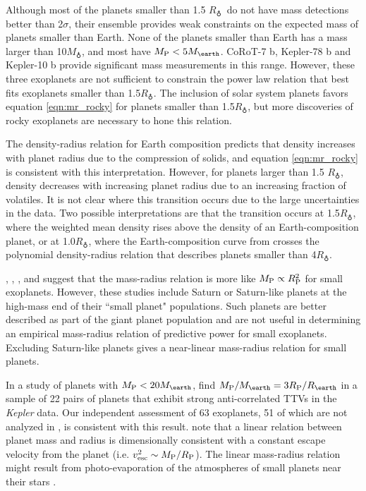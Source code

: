 \documentclass[iop]{emulateapj}
\newcommand{\rpl}{\ensuremath{R_{\rm P}}}
\newcommand{\mpl}{\ensuremath{M_{\rm P}}}
\newcommand{\rearth}{\ensuremath{R_\earth}}
\newcommand{\mearth}{\ensuremath{M_\earth}}
\begin{document}
Although most of the planets smaller than 1.5 \rearth\ do not have mass detections better than 2$\sigma$, their ensemble provides weak constraints on the expected mass of planets smaller than Earth.  None of the planets smaller than Earth has a mass larger than 10\mearth, and most have $\mpl < 5\mearth$.  CoRoT-7 b, Kepler-78 b and Kepler-10 b provide significant mass measurements in this range.  However, these three exoplanets are not sufficient to constrain the power law relation that best fits exoplanets smaller than 1.5\rearth.  The inclusion of solar system planets favors equation \ref{eqn:mr_rocky} for planets smaller than 1.5\rearth, but more discoveries of rocky exoplanets are necessary to hone this relation.

The \citet{Seager2007} density-radius relation for Earth composition predicts that density increases with planet radius due to the compression of solids, and equation \ref{eqn:mr_rocky} is consistent with this interpretation.  However, for planets larger than 1.5 \rearth, density decreases with increasing planet radius due to an increasing fraction of volatiles.  It is not clear where this transition occurs due to the large uncertainties in the data.  Two possible interpretations are that the transition occurs at 1.5\rearth, where the weighted mean density rises above the density of an Earth-composition planet, or at 1.0\rearth, where the Earth-composition curve from \citet{Seager2007} crosses the polynomial density-radius relation that describes planets smaller than 4\rearth.

\citet{Lissauer2011}, \citet{Enoch2012}, \citet{Kane2012}, and \citet{Weiss2013} suggest that the mass-radius relation is more like $\mpl \propto \rpl^2$ for small exoplanets.  However, these studies include Saturn or Saturn-like planets at the high-mass end of their ``small planet" populations.  Such planets are better described as part of the giant planet population and are not useful in determining an empirical mass-radius relation of predictive power for small exoplanets.  Excluding Saturn-like planets gives a near-linear mass-radius relation for small planets.

In a study of planets with $\mpl < 20\mearth$, \citet{WL2013} find $\mpl/\mearth = 3 \rpl/\rearth$ in a sample of 22 pairs of planets that exhibit strong anti-correlated TTVs in the \textit{Kepler} data.  Our independent assessment of 63 exoplanets, 51 of which are not analyzed in \citet{WL2013}, is consistent with this result.  \citet{WL2013} note that a linear relation between planet mass and radius is dimensionally consistent with a constant escape velocity from the planet (i.e. $v_{\mathrm{esc}}^2 \sim \mpl/\rpl$).  The linear mass-radius relation might result from photo-evaporation of the atmospheres of small planets near their stars \citep{Lopez2012}.
\end{document}
